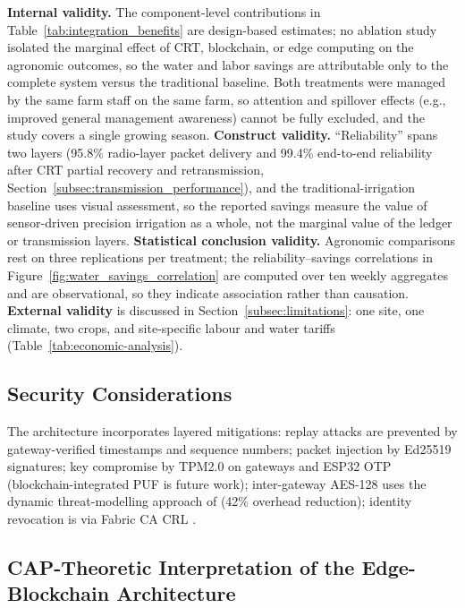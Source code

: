 \documentclass[pdflatex,sn-mathphys-num]{sn-jnl}
\theoremstyle{thmstyleone}
\theoremstyle{thmstyletwo}
\theoremstyle{thmstylethree}
\begin{document}
\textbf{Internal validity.} The component-level contributions in Table~\ref{tab:integration_benefits} are design-based estimates; no ablation study isolated the marginal effect of CRT, blockchain, or edge computing on the agronomic outcomes, so the water and labor savings are attributable only to the complete system versus the traditional baseline. Both treatments were managed by the same farm staff on the same farm, so attention and spillover effects (e.g., improved general management awareness) cannot be fully excluded, and the study covers a single growing season. \textbf{Construct validity.} ``Reliability'' spans two layers (95.8\% radio-layer packet delivery and 99.4\% end-to-end reliability after CRT partial recovery and retransmission, Section~\ref{subsec:transmission_performance}), and the traditional-irrigation baseline uses visual assessment, so the reported savings measure the value of sensor-driven precision irrigation as a whole, not the marginal value of the ledger or transmission layers. \textbf{Statistical conclusion validity.} Agronomic comparisons rest on three replications per treatment; the reliability--savings correlations in Figure~\ref{fig:water_savings_correlation} are computed over ten weekly aggregates and are observational, so they indicate association rather than causation. \textbf{External validity} is discussed in Section~\ref{subsec:limitations}: one site, one climate, two crops, and site-specific labour and water tariffs (Table~\ref{tab:economic-analysis}).

\subsection{Security Considerations}
\label{subsec:security}

The architecture incorporates layered mitigations: replay attacks \cite{yavari2020blockchain} are prevented by gateway-verified timestamps and sequence numbers; packet injection \cite{kalaimathi2025injection} by Ed25519 signatures; key compromise \cite{kumari2025rom} by TPM2.0 on gateways and ESP32 OTP (blockchain-integrated PUF \cite{pufblockchain2025} is future work); inter-gateway AES-128 uses the dynamic threat-modelling approach of \cite{aesembedded2025} (42\% overhead reduction); identity revocation is via Fabric CA CRL \cite{lu2022revocation, hyperledger2022msp}.

\subsection{CAP-Theoretic Interpretation of the Edge-Blockchain Architecture}
\label{subsec:cap_theorem}
\end{document}
